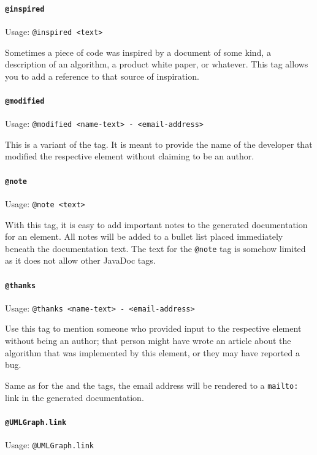 \documentclass[11pt,a4paper, titlepage, parskip=half, headsepline, footsepline, cleardoublepage=current, headheight=1cm]{scrbook}
\begin{document}
\paragraph{\lstinline|@inspired|}\label{sec:TagInspired}  Usage: \lstinline|@inspired <text>|

Sometimes a piece of code was inspired by a document of some kind, a description of an algorithm, a product white paper, or whatever. This tag allows you to add a reference to that source of inspiration. 

\paragraph{\lstinline|@modified|}\label{sec:TagModified}  Usage: \lstinline|@modified <name-text> - <email-address>|

This is a variant of the  tag. It is meant to provide the name of the developer that modified the respective element without claiming to be an author.

\paragraph{\lstinline|@note|}\label{sec:TagNote}  Usage: \lstinline|@note <text>|

With this tag, it is easy to add important notes to the generated documentation for an element. All notes will be added to a bullet list placed immediately beneath the documentation text. The text for the \lstinline|@note| tag is somehow limited as it does not allow other JavaDoc tags.

\paragraph{\lstinline|@thanks|}\label{sec:TagThanks}  Usage: \lstinline|@thanks <name-text> - <email-address>|

Use this tag to mention someone who provided input to the respective element without being an author; that person might have wrote an article about the algorithm that was implemented by this element, or they may have reported a bug.

Same as for the  and the  tags, the email address will be rendered to a \verb#mailto:# link in the generated documentation.

\paragraph{\lstinline|@UMLGraph.link|}\label{sec:TagUMLGraph}  Usage: \lstinline|@UMLGraph.link|
\end{document}
